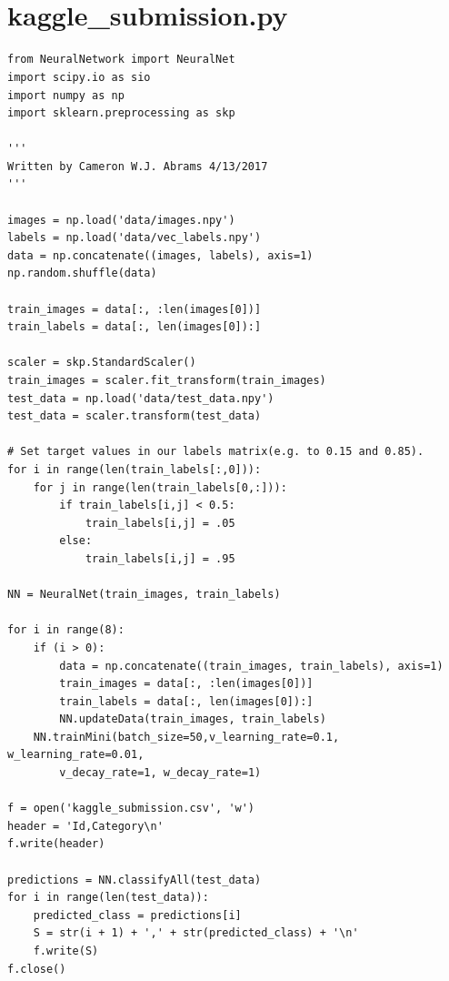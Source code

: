 \documentclass[12pt]{article}
\begin{document}
\section{\\kaggle\_submission.py}
\begin{verbatim}
from NeuralNetwork import NeuralNet
import scipy.io as sio
import numpy as np
import sklearn.preprocessing as skp

'''
Written by Cameron W.J. Abrams 4/13/2017
'''

images = np.load('data/images.npy')
labels = np.load('data/vec_labels.npy')
data = np.concatenate((images, labels), axis=1)
np.random.shuffle(data)

train_images = data[:, :len(images[0])]
train_labels = data[:, len(images[0]):]

scaler = skp.StandardScaler()
train_images = scaler.fit_transform(train_images)
test_data = np.load('data/test_data.npy')
test_data = scaler.transform(test_data)

# Set target values in our labels matrix(e.g. to 0.15 and 0.85).
for i in range(len(train_labels[:,0])):
	for j in range(len(train_labels[0,:])):
		if train_labels[i,j] < 0.5:
			train_labels[i,j] = .05
		else:
			train_labels[i,j] = .95

NN = NeuralNet(train_images, train_labels)

for i in range(8):
	if (i > 0):
		data = np.concatenate((train_images, train_labels), axis=1)
		train_images = data[:, :len(images[0])]
		train_labels = data[:, len(images[0]):]
		NN.updateData(train_images, train_labels)
	NN.trainMini(batch_size=50,v_learning_rate=0.1, w_learning_rate=0.01,
		v_decay_rate=1, w_decay_rate=1)

f = open('kaggle_submission.csv', 'w')
header = 'Id,Category\n'
f.write(header)

predictions = NN.classifyAll(test_data)
for i in range(len(test_data)):
	predicted_class = predictions[i]
	S = str(i + 1) + ',' + str(predicted_class) + '\n'
	f.write(S)
f.close()
\end{verbatim}
\end{document}
